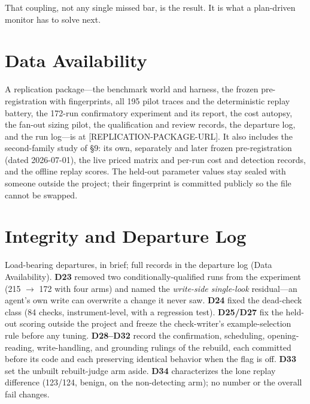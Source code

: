\documentclass[acmsmall,screen]{acmart}
\begin{document}
That coupling, not any single missed bar, is the result. It is what a
plan-driven monitor has to solve next.

\section*{Data Availability}
A replication package---the benchmark world and harness, the frozen
pre-registration with fingerprints, all 195 pilot traces and the deterministic
replay battery, the 172-run confirmatory experiment and its report, the cost
autopsy, the fan-out sizing pilot, the qualification and review records, the
departure log, and the run log---is at [REPLICATION-PACKAGE-URL]. It also includes
the second-family study of \S9: its own, separately and later frozen
pre-registration (dated 2026-07-01), the live priced matrix and per-run cost and
detection records, and the offline replay scores. The held-out parameter values
stay sealed with someone outside the project; their fingerprint is committed
publicly so the file cannot be swapped.

\appendix

\section{Integrity and Departure Log}
Load-bearing departures, in brief; full records in the departure log (Data
Availability). \textbf{D23} removed two conditionally-qualified runs from the
experiment (215 $\rightarrow$ 172 with four arms) and named the \emph{write-side
single-look} residual---an agent's own write can overwrite a change it never
saw. \textbf{D24} fixed the dead-check class (84 checks, instrument-level, with a
regression test). \textbf{D25/D27} fix the held-out scoring outside the project
and freeze the check-writer's example-selection rule before any tuning.
\textbf{D28--D32} record the confirmation, scheduling, opening-reading,
write-handling, and grounding rulings of the rebuild, each committed before its
code and each preserving identical behavior when the flag is off. \textbf{D33}
set the unbuilt rebuilt-judge arm aside. \textbf{D34} characterizes the lone
replay difference (123/124, benign, on the non-detecting arm); no number or the
overall fail changes.
\end{document}
